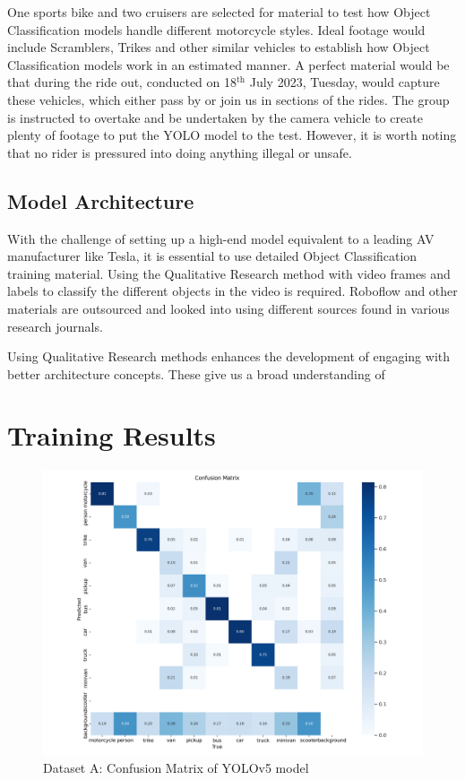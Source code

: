 \documentclass[conference]{IEEEtran}
\begin{document}
		One sports bike and two cruisers are selected for material to test how Object Classification models handle different motorcycle styles. Ideal footage would include Scramblers, Trikes and other similar vehicles to establish how Object Classification models work in an estimated manner. A perfect material would be that during the ride out, conducted on 18$^\text{th}$ July 2023, Tuesday, would capture these vehicles, which either pass by or join us in sections of the rides. The group is instructed to overtake and be undertaken by the camera vehicle to create plenty of footage to put the YOLO model to the test. However, it is worth noting that no rider is pressured into doing anything illegal or unsafe.

	\subsection{Model Architecture}
		With the challenge of setting up a high-end model equivalent to a leading AV manufacturer like Tesla, it is essential to use detailed Object Classification training material. Using the Qualitative Research method with video frames and labels to classify the different objects in the video is required. Roboflow and other materials are outsourced and looked into using different sources found in various research journals.

		Using Qualitative Research methods enhances the development of engaging with better architecture concepts. These give us a broad understanding of 

\section{Training Results}
		\begin{figure}[h]
			\centering
			\includegraphics[width=\columnwidth]{Figures/dataset_a/a_confusion_matrix.png}
			\caption{Dataset A: Confusion Matrix of YOLOv5 model}
			\label{fig:ukDatasetYolov5LargeWeight}
		\end{figure}
		
\end{document}
